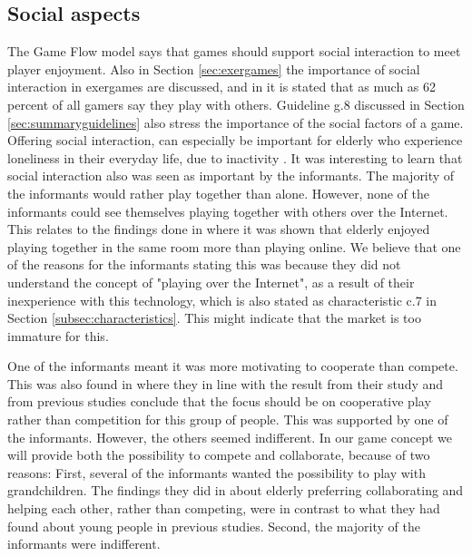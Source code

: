 \subsection{Social aspects}
The Game Flow model says that games should support social interaction to meet player enjoyment. Also in Section \ref{sec:exergames} the importance of social interaction in exergames are discussed, and  in \cite{statistics2012} it is stated that as much as 62 percent of all gamers say they play with others. Guideline g.8 discussed in Section \ref{sec:summaryguidelines} also stress the importance of the social factors of a game. Offering social interaction, can especially be important for elderly who experience loneliness in their everyday life, due to inactivity \cite{exergamesforelderly}. It was interesting to learn that social interaction also was seen as important by the informants. The majority of the informants would rather play together than alone. However, none of the informants could see themselves playing together with others over the Internet. This relates to the findings done in \cite{Gajadhar} where it was shown that elderly enjoyed playing together in the same room more than playing online. We believe that one of the reasons for the informants stating this was because they did not understand the concept of "playing over the Internet", as a result of their inexperience with this technology, which is also stated as characteristic c.7 in Section \ref{subsec:characteristics}. This might indicate that the market is too immature for this. 

One of the informants meant it was more motivating to cooperate than compete. This was also found in \cite{Gajadhar} where they in line with the result from their study and from previous studies conclude that the focus should be on cooperative play rather than competition for this group of people. This was supported by one of the informants. However, the others seemed indifferent. In our game concept we will provide both the possibility to compete and collaborate, because of two reasons: First, several of the informants wanted the possibility to play with grandchildren. The findings they did in \cite{Gajadhar} about elderly preferring collaborating and helping each other, rather than competing, were in contrast to what they had found about young people in previous studies. Second, the majority of the informants were indifferent. 
 


